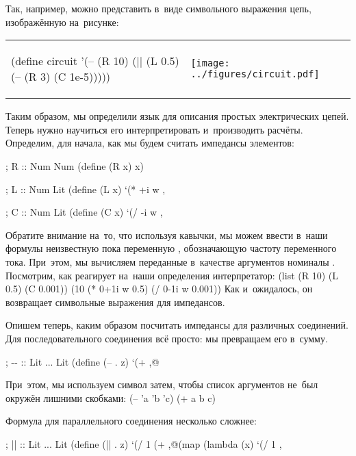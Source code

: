 Так, например, можно представить в~виде символьного выражения цепь, изображённую на~рисунке:

\begin{tabular}{ll}\label{circuit}
\begin{SchemeCode}
(define circuit
 '(-- (R 10)
       (|| (L 0.5)
           (-- (R 3)
               (C 1e-5)))))
\end{SchemeCode}
&
\texttt{[image: ../figures/circuit.pdf]}
\end{tabular}

Таким образом, мы определили язык для описания простых электрических цепей. Теперь нужно научиться его интерпретировать и~производить расчёты. Определим, для начала, как мы будем считать импедансы элементов:

\begin{Definition}[emph={x}]
; R :: Num \arrow Num
(define (R x) x)

; L :: Num \arrow Lit
(define (L x) `(* +i w ,%

; C :: Num \arrow Lit
(define (C x) `(/ -i w ,%
\end{Definition}

Обратите внимание на~то, что используя кавычки, мы можем ввести в~наши формулы неизвестную пока переменную , обозначающую частоту переменного тока. При~этом, мы вычисляем переданные в~качестве аргументов номиналы . Посмотрим, как реагирует на~наши определения интерпретатор:
\REPL
  {(list (R 10) (L 0.5) (C 0.001))}
  {(10 (* 0+1i w 0.5) (/ 0-1i w 0.001))}
\noindent Как и~ожидалось, он возвращает символьные выражения для импедансов.

Опишем теперь, каким образом посчитать импедансы для различных соединений. Для последовательного соединения всё просто: мы превращаем его в~сумму.
\begin{Definition}[emph=z]
; -{-} :: Lit ... \arrow Lit
(define (-- . z) `(+ ,@%
\end{Definition}
\noindent При~этом, мы используем символ  затем, чтобы список аргументов не~был окружён лишними скобками:
\REPL
  {(-- 'a 'b 'c)}
  {(+ a b c)}

Формула для параллельного соединения несколько сложнее:
\begin{Definition}[emph={x,z}]
; || :: Lit ... \arrow Lit
(define (|| . z)
  `(/ 1 (+ ,@(map (lambda (x) `(/ 1 ,%
\end{Definition}

